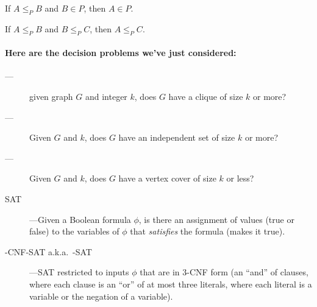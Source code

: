 \documentclass[11pt]{article}
\begin{document}
\setcounter{lemma}{0}
\begin{restatement}

\begin{lemma}
  If $A \le_P B$ and $B\in P$, then $A\in P$.
\end{lemma}

\begin{lemma}
  If $A\le_P B$ and $B\le_P C$, then $A\le_P C$.
\end{lemma}

\paragraph{Here are the decision problems we've just considered:}

\begin{description}
  
\item[---]
  given graph $G$ and integer $k$, does $G$ have a clique of size $k$ or more?

\item[---]
  Given $G$ and $k$,
  does $G$ have an independent set of size $k$ or more?

\item[---]
  Given $G$ and $k$,
  does $G$ have a vertex cover of size $k$ or less?

\item[\sc SAT]---Given a Boolean formula $\phi$,
  is there an assignment of values (true or false) to the variables of $\phi$
  that \emph{satisfies} the formula (makes it true).

\item[{-CNF-SAT} a.k.a.~-SAT]---{\sc SAT} restricted to inputs $\phi$ that are in 3-CNF form
  (an ``and'' of clauses, where each clause is an ``or'' of at most three literals,
  where each literal is a variable or the negation of a variable).
  
\end{description}


\end{restatement}
\end{document}

